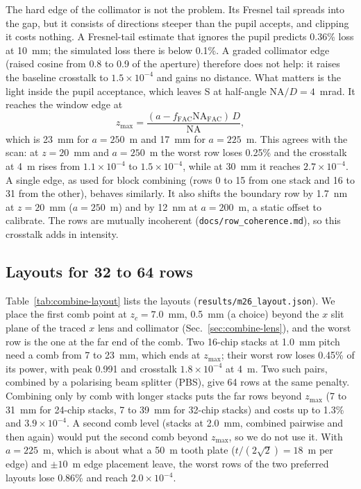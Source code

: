 The hard edge of the collimator is not the problem. Its Fresnel tail spreads into the gap, but it consists of directions steeper than the pupil accepts, and clipping it costs nothing. A Fresnel-tail estimate that ignores the pupil predicts 0.36\% loss at 10~mm; the simulated loss there is below 0.1\%. A graded collimator edge (raised cosine from 0.8 to 0.9 of the aperture) therefore does not help: it raises the baseline crosstalk to $1.5\times10^{-4}$ and gains no distance. What matters is the light inside the pupil acceptance, which leaves S at half-angle $\mathrm{NA}/D=4$~mrad. It reaches the window edge at
\begin{equation}
z_\mathrm{max}=\frac{(a-f_\mathrm{FAC}\mathrm{NA}_\mathrm{FAC})\,D}{\mathrm{NA}},
\label{eq:zmax}
\end{equation}
which is 23~mm for $a=250$~\textmu m and 17~mm for $a=225$~\textmu m. This agrees with the scan: at $z=20$~mm and $a=250$~\textmu m the worst row loses 0.25\% and the crosstalk at 4~\textmu m rises from $1.1\times10^{-4}$ to $1.5\times10^{-4}$, while at 30~mm it reaches $2.7\times10^{-4}$. A single edge, as used for block combining (rows 0 to 15 from one stack and 16 to 31 from the other), behaves similarly. It also shifts the boundary row by 1.7~nm at $z=20$~mm ($a=250$~\textmu m) and by 12~nm at $a=200$~\textmu m, a static offset to calibrate. The rows are mutually incoherent (\texttt{docs/\allowbreak row\_coherence.md}), so this crosstalk adds in intensity.

\subsection{Layouts for 32 to 64 rows}\label{sec:combine-layouts}

Table~\ref{tab:combine-layout} lists the layouts (\texttt{results/\allowbreak m26\_layout.json}). We place the first comb point at $z_c=7.0$~mm, 0.5~mm (a choice) beyond the $x$ slit plane of the traced $x$ lens and collimator (Sec.~\ref{sec:combine-lens}), and the worst row is the one at the far end of the comb. Two 16-chip stacks at 1.0~mm pitch need a comb from 7 to 23~mm, which ends at $z_\mathrm{max}$; their worst row loses 0.45\% of its power, with peak 0.991 and crosstalk $1.8\times10^{-4}$ at 4~\textmu m. Two such pairs, combined by a polarising beam splitter (PBS), give 64 rows at the same penalty. Combining only by comb with longer stacks puts the far rows beyond $z_\mathrm{max}$ (7 to 31~mm for 24-chip stacks, 7 to 39~mm for 32-chip stacks) and costs up to 1.3\% and $3.9\times10^{-4}$. A second comb level (stacks at 2.0~mm, combined pairwise and then again) would put the second comb beyond $z_\mathrm{max}$, so we do not use it. With $a=225$~\textmu m, which is about what a 50~\textmu m tooth plate ($t/(2\sqrt{2})=18$~\textmu m per edge) and $\pm10$~\textmu m edge placement leave, the worst rows of the two preferred layouts lose 0.86\% and reach $2.0\times10^{-4}$.

